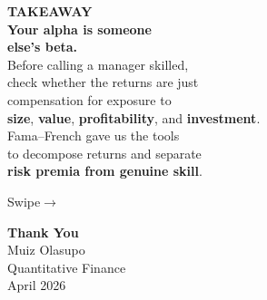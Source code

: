 \documentclass{beamer}
\newcommand{\swipe}{%
  \vfill\hfill{\color{muted}\small Swipe\;$\rightarrow$}%
}
\begin{document}
\begin{frame}[plain,shrink=25]
  \vfill
  \begin{center}
    {\fontsize{14}{18}\selectfont\color{accent}\bfseries%
      TAKEAWAY}\\[0.6cm]
    {\fontsize{24}{30}\selectfont\bfseries\color{ink}%
      Your alpha is someone\\[0.15cm]
      else's beta.}\\[0.8cm]
    {\fontsize{15}{20}\selectfont\color{muted}%
      Before calling a manager skilled,\\[0.1cm]
      check whether the returns are just\\[0.1cm]
      compensation for exposure to\\[0.1cm]
      \textbf{\color{accentorange}size},
      \textbf{\color{accentgreen}value},
      \textbf{\color{accentpurple}profitability},
      and \textbf{\color{accent}investment}.}\\[0.7cm]
    {\fontsize{14}{18}\selectfont\color{ink}%
      Fama--French gave us the tools\\[0.1cm]
      to decompose returns and separate\\[0.1cm]
      \textbf{risk premia from genuine skill}.}
  \end{center}
  \vfill
  \swipe
  \vspace{0.3cm}
\end{frame}

\begin{frame}[plain,shrink=25]
  \vspace{2.5cm}
  \begin{center}
    {\fontsize{28}{32}\selectfont\bfseries\color{ink}%
      Thank You}\\[0.8cm]
    {\fontsize{16}{20}\selectfont\color{ink}%
      Muiz Olasupo}\\[0.3cm]
    {\fontsize{13}{17}\selectfont\color{muted}%
      Quantitative Finance}\\[0.15cm]
    {\fontsize{13}{17}\selectfont\color{muted}%
      April 2026}
  \end{center}
  \vfill
\end{frame}
\end{document}
